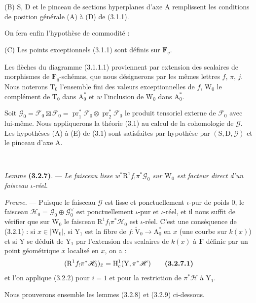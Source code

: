 \documentclass[11pt,leqno]{article}
\newcommand{\Page}[1]{\ifvmode\noindent\else\unskip\ \fi{\footnotesize\textcolor{gray}{[p.\,#1]}}\ \ignorespaces}
\begin{document}
(B) \(\mathrm{S}\), \(\mathrm{D}\) et le pinceau de sections hyperplanes d’axe \(\mathrm{A}\) remplissent les conditions de position générale (A) à (D) de (3.1.1).

On fera enfin l’hypothèse de commodité :

(C) Les points exceptionnels (3.1.1) sont définis sur \(\mathbf{F}_q\).

Les flèches du diagramme (3.1.1.1) proviennent par extension des scalaires de morphismes de \(\mathbf{F}_q\)-schémas, que nous désignerons par les mêmes lettres \(f\), \(\pi\), \(j\). Nous noterons \(\mathrm{T}_0\) l’ensemble fini des valeurs exceptionnelles de \(f\), \(\mathrm{W}_0\) le complément de \(\mathrm{T}_0\) dans \(\mathrm{A}_0^*\) et \(w\) l’inclusion de \(\mathrm{W}_0\) dans \(\mathrm{A}_0^*\).

Soit \(\mathscr{G}_0=\mathscr{F}_0\boxtimes\mathscr{F}_0=\operatorname{pr}_1^*\mathscr{F}_0\otimes\operatorname{pr}_2^*\mathscr{F}_0\) le produit tensoriel externe de \(\mathscr{F}_0\) avec lui-même. Nous appliquerons la théorie (3.1) au calcul de la cohomologie de \(\mathscr{G}\). Les hypothèses (A) à (E) de (3.1) sont satisfaites par hypothèse par \((\mathrm{S},\mathrm{D},\mathscr{G})\) et le pinceau d’axe \(\mathrm{A}\).

\Page{202}

\textit{Lemme} \textbf{(3.2.7)}. — \textit{Le faisceau lisse \(w^*\mathrm{R}^1f_!\pi^*\mathscr{G}_0\) sur \(\mathrm{W}_0\) est facteur direct d’un faisceau \(\iota\)-réel.}

\textit{Preuve.} — Puisque le faisceau \(\mathscr{G}\) est lisse et ponctuellement \(\iota\)-pur de poids \(0\), le faisceau \(\mathscr{H}_0=\mathscr{G}_0\oplus\mathscr{G}_0^\vee\) est ponctuellement \(\iota\)-pur et \(\iota\)-réel, et il nous suffit de vérifier que sur \(\mathrm{W}_0\) le faisceau \(\mathrm{R}^1f_!\pi^*\mathscr{H}_0\) est \(\iota\)-réel. C’est une conséquence de (3.2.1) : si \(x\in|\mathrm{W}_0|\), si \(\mathrm{Y}_1\) est la fibre de \(f:\widetilde{\mathrm{V}}_0\to\mathrm{A}_0^*\) en \(x\) (une courbe sur \(k(x)\)) et si \(\mathrm{Y}\) se déduit de \(\mathrm{Y}_1\) par l’extension des scalaires de \(k(x)\) à \(\mathbf{F}\) définie par un point géométrique \(\bar{x}\) localisé en \(x\), on a :
\[
(\mathrm{R}^1f_!\pi^*\mathscr{H}_0)_{\bar{x}}
=\mathrm{H}_c^1(\mathrm{Y},\pi^*\mathscr{H})
\tag*{\textbf{(3.2.7.1)}}
\]
et l’on applique (3.2.2) pour \(i=1\) et pour la restriction de \(\pi^*\mathscr{H}\) à \(\mathrm{Y}_1\).

Nous prouverons ensemble les lemmes (3.2.8) et (3.2.9) ci-dessous.
\end{document}
